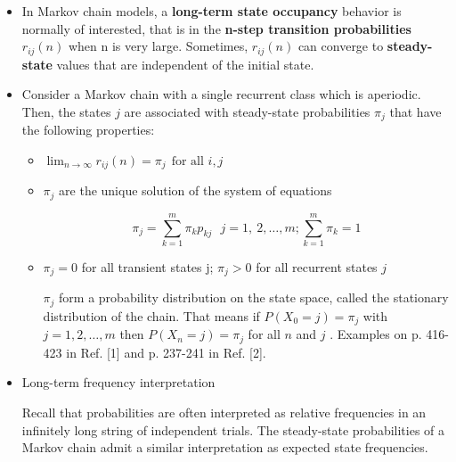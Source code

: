 \documentclass[12pt]{report}
\renewcommand{\_}{\kern-1.5pt\textunderscore\kern-1.5pt}
\begin{document}
\begin{itemize}
	\item In Markov chain models, a \textbf{long-term state occupancy} behavior is normally of interested, that is in the \textbf{n-step transition probabilities}  \( r_{ij} \left( n \right)  \)  when n is very large. Sometimes,  \( r_{ij} \left( n \right)  \)  can converge to \textbf{steady-state} values that are independent of the initial state. \par

	\item Consider a Markov chain with a single recurrent class which is aperiodic. Then, the states  \( j \)  are associated with steady-state probabilities  \(  \pi _{j} \)  that have the following properties:\par

\begin{itemize}
	\item  \( \mathop{\lim }_{n \rightarrow \infty}r_{ij} \left( n \right) = \pi _{j}~~\mathrm{\text{for all }}i,j \) \par

	\item  \(  \pi _{j} \)  are the unique solution of the system of equations\par

 \[  \pi _{j}= \sum _{k=1}^{m} \pi _{k}p_{kj}~~~j=1,~2, \ldots , m;    \sum _{k=1}^{m} \pi _{k}=1 \] \par

	\item  \(  \pi _{j}=0 \)  for all transient states j;  \(  \pi _{j}>0 \)  for all recurrent states  \( j \) \par

 \(  \pi _{j} \)  form a probability distribution on the state space, called the stationary distribution of the chain. That means if  \( P \left( X_{0}=j \right) = \pi _{j} \)  with  \( j=1, 2, \ldots , m \)  then  \( P \left( X_{n}=j \right) = \pi _{j} \)  for all  \( n \)  and  \( j \) . Examples on p. 416-423 in Ref. [1] and p. 237-241 in Ref. [2].\par


\end{itemize}
	\item Long-term frequency interpretation\par

Recall that probabilities are often interpreted as relative frequencies in an infinitely long string of independent trials. The steady-state probabilities of a Markov chain admit a similar interpretation as expected state frequencies.\par


\end{itemize}
\end{document}
